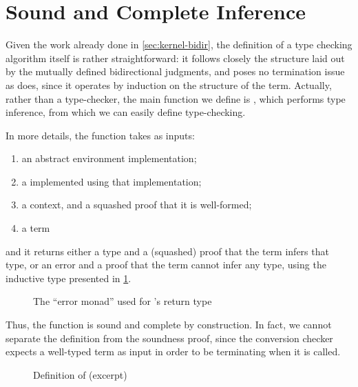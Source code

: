 \section{Sound and Complete Inference}
\label{sec:kernel-typing}

Given the work already done in \cref{sec:kernel-bidir}, the definition of a
type checking algorithm 
itself is rather straightforward: it follows closely
the structure laid out by the mutually defined bidirectional judgments, and
poses no termination issue as  does, since it
operates by induction on the structure of the term.
Actually, rather than a type-checker, the main function we define is
, which performs type inference,%
from which we can easily define type-checking.

In more details, the function takes as inputs:
\begin{enumerate}
  \item an abstract environment implementation;
  \item a  implemented using that implementation;
  \item a context, and a squashed proof that it is well-formed;
  \item a term
\end{enumerate}
and it returns either a type and a (squashed) proof that the term infers that type, or
an error and a proof that the term cannot infer any type, using the inductive type presented in
\cref{fig:meta-error-mon}.
\begin{figure}
  \caption{The “error monad” used for ’s return type}
  \label{fig:meta-error-mon}
\end{figure}
Thus, the function is sound and complete by construction.
In fact, we cannot separate
the definition from the soundness proof, since the conversion checker
expects a well-typed term as input in order to be terminating when it is called.

\begin{figure*}
  \caption{Definition of  (excerpt)}
  \label{fig:meta-infer}
\end{figure*}

